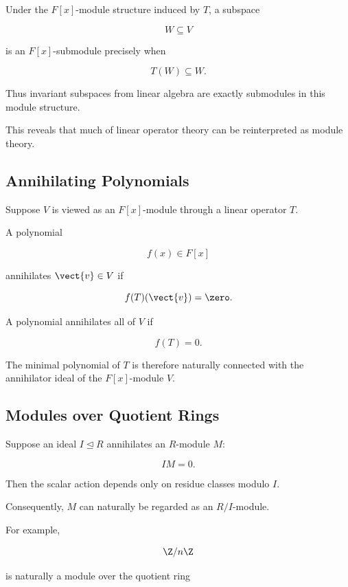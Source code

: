 Under the \(F[x]\)-module structure induced by \(T\), a subspace

\[ W\subseteq V \]

is an \(F[x]\)-submodule precisely when

\[ T(W)\subseteq W. \]

Thus invariant subspaces from linear algebra are exactly submodules in this
module structure.

This reveals that much of linear operator theory can be reinterpreted as
module theory.

\subsection{Annihilating Polynomials}
\label{subsec:annihilating-polynomials}

Suppose \(V\) is viewed as an \(F[x]\)-module through a linear operator \(T\).

A polynomial

\[ f(x)\in F[x] \]

annihilates \(\vect{v}\in V\) if

\[ f(T)(\vect{v})=\zero. \]

A polynomial annihilates all of \(V\) if

\[ f(T)=0. \]

The minimal polynomial of \(T\) is therefore naturally connected with the
annihilator ideal of the \(F[x]\)-module \(V\).

\subsection{Modules over Quotient Rings}
\label{subsec:modules-quotient-rings}

Suppose an ideal \(I\trianglelefteq R\) annihilates an \(R\)-module \(M\):

\[ IM=0. \]

Then the scalar action depends only on residue classes modulo \(I\).

Consequently, \(M\) can naturally be regarded as an \(R/I\)-module.

For example,

\[ \Z/n\Z \]

is naturally a module over the quotient ring

